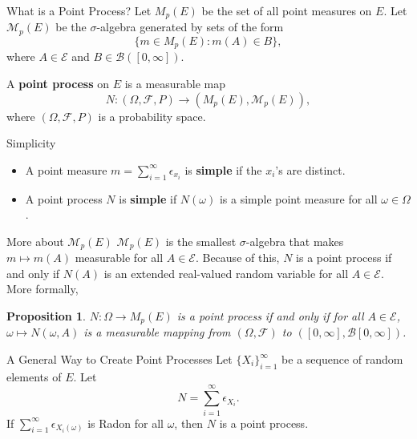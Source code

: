 \documentclass{beamer}
\newtheorem{proposition}{Proposition}
\begin{document}
\begin{frame}{What is a Point Process?}
    Let $M_p(E)$ be the set of all point measures on $E$. Let $\mathcal{M}_p(E)$ be the $\sigma$-algebra generated by sets of the form
    \[
    \{m \in M_p(E) : m(A) \in B\},
    \]
    where $A \in \mathcal{E}$ and $B \in \mathcal{B}([0, \infty])$.

    \smallskip

    \begin{definition}
        A \textbf{point process} on $E$ is a measurable map
        \[
        N : (\Omega, \mathcal{F}, P) \to (M_p(E), \mathcal{M}_p(E)),
        \]
        where $(\Omega, \mathcal{F}, P)$ is a probability space.
    \end{definition}
\end{frame}

\begin{frame}{Simplicity}
    \begin{itemize}
        \item A point measure $m = \sum_{i = 1}^{\infty} \epsilon_{x_i}$ is \textbf{simple} if the $x_i$'s are distinct.
        \item A point process $N$ is \textbf{simple} if $N(\omega)$ is a simple point measure for all $\omega \in \Omega$.
    \end{itemize}
\end{frame}

\begin{frame}{More about $\mathcal{M}_p(E)$}
    $\mathcal{M}_p(E)$ is the smallest $\sigma$-algebra that makes $m \mapsto m(A)$ measurable for all $A \in \mathcal{E}$. Because of this, $N$ is a point process if and only if $N(A)$ is an extended real-valued random variable for all $A \in \mathcal{E}$. More formally,
    \begin{proposition}
    $N : \Omega \to M_p(E)$ is a point process if and only if for all $A \in \mathcal{E}$, $\omega \mapsto N(\omega, A)$ is a measurable mapping from $(\Omega, \mathcal{F})$ to $([0, \infty], \mathcal{B}[0, \infty])$.
    \end{proposition}
\end{frame}

\begin{frame}{A General Way to Create Point Processes}
    Let $\{X_i\}_{i = 1}^{\infty}$ be a sequence of random elements of $E$. Let
    \[
    N = \sum_{i = 1}^{\infty} \epsilon_{X_i}.
    \]
    If $\sum_{i = 1}^{\infty} \epsilon_{X_i(\omega)}$ is Radon for all $\omega$, then $N$ is a point process.
\end{frame}
\end{document}

